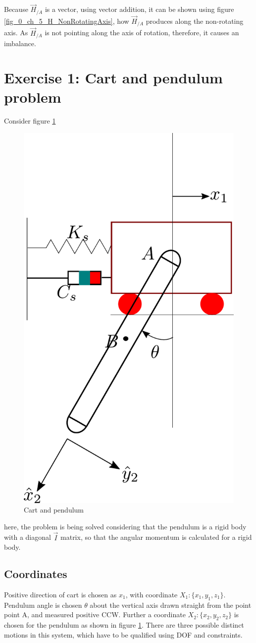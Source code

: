 Because $\vec{H}_{/A}$ is a vector, using vector addition, it can be shown using figure \ref{fig_0_ch_5_H_NonRotatingAxis}, how $\vec{H}_{/A}$ produces along the non-rotating axis. As $\vec{H}_{/A}$ is not pointing along the axis of rotation, therefore, it causes an imbalance.

\section{Exercise 1: Cart and pendulum problem}

Consider figure \ref{fig_0_ch_5_cadtAndPendulum1}
\begin{figure}[h!]
	\centering
	\includegraphics[width=0.5\linewidth]{Bilder/28_CartWithPendulum.pdf}
	\caption{Cart and pendulum}
	\label{fig_0_ch_5_cadtAndPendulum1}
\end{figure}

here, the problem is being solved considering that the pendulum is a rigid body with a diagonal $\vec{I}$ matrix, so that the angular momentum is calculated for a rigid body. 

\subsection{Coordinates}

Positive direction of cart is chosen as $x_{1}$, with coordinate $X_1 : \{ x_1, y_1, z_1 \}$. Pendulum angle is chosen $\theta$ about the vertical axis drawn straight from the point point A, and measured positive CCW. Further a coordinate $X_2 : \{ x_2, y_2, z_2 \}$ is chosen for the pendulum as shown in figure \ref{fig_0_ch_5_cadtAndPendulum1}. There are three possible distinct motions in this system, which have to be qualified using DOF and constraints.
\newpage
